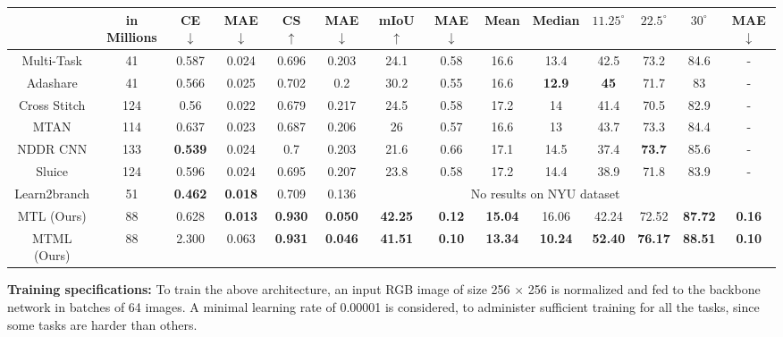 \documentclass[conference]{IEEEtran}
\begin{document}
\begin{table*}[ht]
{\begin{tabular}{cc|cccc|cccccccc}
\multicolumn{1}{c|}{} & in Millions & CE $\downarrow$ & MAE $\downarrow$ & CS $\uparrow$ & MAE $\downarrow$ & mIoU $\uparrow$ & MAE $\downarrow$ & Mean & Median & $11.25^{\circ}$ & $22.5^{\circ}$ & $30^{\circ}$ & MAE $\downarrow$ \\ \hline
\multicolumn{1}{c|}{Multi-Task \cite{sun2020adashare}} & 41 & 0.587 & 0.024 & 0.696 & 0.203 & 24.1 & 0.58 & 16.6 & 13.4 & 42.5 & 73.2 & 84.6 & - \\
\multicolumn{1}{c|}{Adashare \cite{sun2020adashare}} & 41 & 0.566 & 0.025 & 0.702 & 0.2 & 30.2 & 0.55 & 16.6 & \textbf{12.9} & \textbf{45} & 71.7 & 83 & - \\
\multicolumn{1}{c|}{Cross Stitch \cite{misra2016cross}} & 124 & 0.56 & 0.022 & 0.679 & 0.217 & 24.5 & 0.58 & 17.2 & 14 & 41.4 & 70.5 & 82.9 & - \\
\multicolumn{1}{c|}{MTAN \cite{liu2019end}} & 114 & 0.637 & 0.023 & 0.687 & 0.206 & 26 & 0.57 & 16.6 & 13 & 43.7 & 73.3 & 84.4 & - \\
\multicolumn{1}{c|}{NDDR CNN \cite{gao2019nddr}} & 133 & \textbf{0.539} & 0.024 & 0.7 & 0.203 & 21.6 & 0.66 & 17.1 & 14.5 & 37.4 & \textbf{73.7} & 85.6 & - \\
\multicolumn{1}{c|}{Sluice \cite{ruder2019latent}} & 124 & 0.596 & 0.024 & 0.695 & 0.207 & 23.8 & 0.58 & 17.2 & 14.4 & 38.9 & 71.8 & 83.9 & - \\
\multicolumn{1}{c|}{Learn2branch \cite{guo2020learning}} & 51 & \textbf{0.462} & \textbf{0.018} & 0.709 & 0.136 & \multicolumn{7}{c}{No results on NYU dataset} & \multicolumn{1}{l}{} \\ \hline
\multicolumn{1}{c|}{\ac{MTL} (Ours)} & 88 & 0.628 & \textbf{0.013} & \textbf{0.930}& \textbf{0.050}& \textbf{42.25} & \textbf{0.12} & \textbf{15.04} & 16.06 & 42.24 & 72.52 & \textbf{87.72} & \textbf{0.16} \\
\multicolumn{1}{c|}{\ac{MTML} (Ours)} & 88 & 2.300 & 0.063 & \textbf{0.931} & \textbf{0.046} & \textbf{41.51} & \textbf{0.10} & \textbf{13.34} & \textbf{10.24} & \textbf{52.40} & \textbf{76.17} &\textbf{88.51} & \textbf{0.10} \\ \hline
\end{tabular}}
\end{table*} 
\textbf{Training specifications:} To train the above architecture, an input RGB image of size 256 $\times$ 256 is normalized and fed to the backbone network in batches of 64 images.
A minimal learning rate of 0.00001 is considered, to administer sufficient training for all the tasks, since some tasks are harder than others. 
\end{document}
